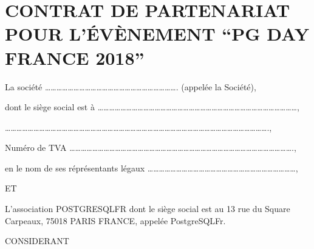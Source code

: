\documentclass[]{article}
\date{}
\begin{document}
\hypertarget{contrat-de-partenariat-pour-luxe9vuxe8nement-pg-day-france-2018}{%
\section{CONTRAT DE PARTENARIAT POUR L'ÉVÈNEMENT ``PG DAY FRANCE
2018''}\label{contrat-de-partenariat-pour-luxe9vuxe8nement-pg-day-france-2018}}

La société
\ldots{}\ldots{}\ldots{}\ldots{}\ldots{}\ldots{}\ldots{}\ldots{}\ldots{}\ldots{}\ldots{}\ldots{}\ldots{}\ldots{}\ldots{}\ldots{}\ldots{}\ldots{}\ldots{}\ldots{}\ldots{}\ldots{}\ldots{}.
(appelée la Société),

dont le siège social est à
\ldots{}\ldots{}\ldots{}\ldots{}\ldots{}\ldots{}\ldots{}\ldots{}\ldots{}\ldots{}\ldots{}\ldots{}\ldots{}\ldots{}\ldots{}\ldots{}\ldots{}\ldots{}\ldots{}\ldots{}\ldots{}\ldots{}\ldots{}\ldots{}\ldots{}\ldots{}\ldots{}\ldots{}\ldots{}\ldots{}\ldots{}\ldots{}\ldots{}\ldots{}\ldots{},

\ldots{}\ldots{}\ldots{}\ldots{}\ldots{}\ldots{}\ldots{}\ldots{}\ldots{}\ldots{}\ldots{}\ldots{}\ldots{}\ldots{}\ldots{}\ldots{}\ldots{}\ldots{}\ldots{}\ldots{}\ldots{}\ldots{}\ldots{}\ldots{}\ldots{}\ldots{}\ldots{}\ldots{}\ldots{}\ldots{}\ldots{}\ldots{}\ldots{}\ldots{}\ldots{}\ldots{}\ldots{}\ldots{}\ldots{}\ldots{}\ldots{}\ldots{}\ldots{}\ldots{}\ldots{}\ldots{}.,

Numéro de TVA
\ldots{}\ldots{}\ldots{}\ldots{}\ldots{}\ldots{}\ldots{}\ldots{}\ldots{}\ldots{}\ldots{}\ldots{}\ldots{}\ldots{}\ldots{}\ldots{}\ldots{}\ldots{}\ldots{}\ldots{}\ldots{}\ldots{}\ldots{}\ldots{}\ldots{}\ldots{}\ldots{}\ldots{}\ldots{}\ldots{}\ldots{}\ldots{}\ldots{}\ldots{}\ldots{}\ldots{}\ldots{}\ldots{}\ldots{}.,

en le nom de ses réprésentants légaux
\ldots{}\ldots{}\ldots{}\ldots{}\ldots{}\ldots{}\ldots{}\ldots{}\ldots{}\ldots{}\ldots{}\ldots{}\ldots{}\ldots{}\ldots{}\ldots{}\ldots{}\ldots{}\ldots{}\ldots{}\ldots{}\ldots{}\ldots{}\ldots{}\ldots{}\ldots{},

ET

L'association POSTGRESQLFR dont le siège social est au 13 rue du Square
Carpeaux, 75018 PARIS FRANCE, appelée PostgreSQLFr.

CONSIDERANT
\end{document}
